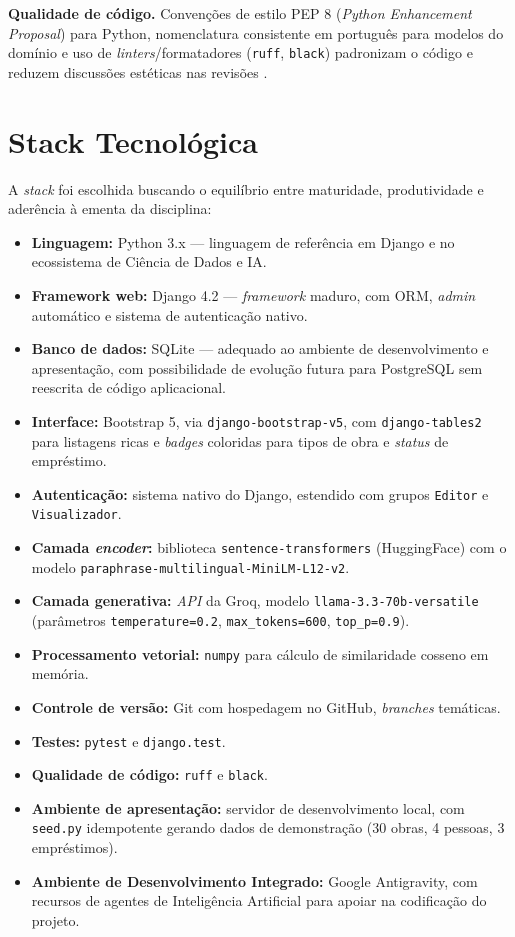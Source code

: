 \documentclass[monografia,abnt]{inf-ufg-modificado}
\begin{document}
\noindent\textbf{Qualidade de código.} Convenções de estilo PEP 8 (\textit{Python Enhancement Proposal}) para Python, nomenclatura consistente em português para modelos do domínio e uso de \textit{linters}/formatadores (\texttt{ruff}, \texttt{black}) padronizam o código e reduzem discussões estéticas nas revisões \cite{pep8}.

\chapter{Stack Tecnológica}

A \textit{stack} foi escolhida buscando o equilíbrio entre maturidade, produtividade e aderência à ementa da disciplina:

\begin{itemize}
    \item \textbf{Linguagem:} Python 3.x --- linguagem de referência em Django e no ecossistema de Ciência de Dados e IA.
    \item \textbf{Framework web:} Django 4.2 --- \textit{framework} maduro, com ORM, \textit{admin} automático e sistema de autenticação nativo.
    \item \textbf{Banco de dados:} SQLite --- adequado ao ambiente de desenvolvimento e apresentação, com possibilidade de evolução futura para PostgreSQL sem reescrita de código aplicacional.
    \item \textbf{Interface:} Bootstrap 5, via \texttt{django-bootstrap-v5}, com \texttt{django-tables2} para listagens ricas e \textit{badges} coloridas para tipos de obra e \textit{status} de empréstimo.
    \item \textbf{Autenticação:} sistema nativo do Django, estendido com grupos \texttt{Editor} e \texttt{Visualizador}.
    \item \textbf{Camada \textit{encoder}:} biblioteca \texttt{sentence-transformers} (HuggingFace) com o modelo \texttt{paraphrase-multilingual-MiniLM-L12-v2}.
    \item \textbf{Camada generativa:} \textit{API} da Groq, modelo \texttt{llama-3.3-70b-versatile} (parâmetros \texttt{temperature=0.2}, \texttt{max\_tokens=600}, \texttt{top\_p=0.9}).
    \item \textbf{Processamento vetorial:} \texttt{numpy} para cálculo de similaridade cosseno em memória.
    \item \textbf{Controle de versão:} Git com hospedagem no GitHub, \textit{branches} temáticas.
    \item \textbf{Testes:} \texttt{pytest} e \texttt{django.test}.
    \item \textbf{Qualidade de código:} \texttt{ruff} e \texttt{black}.
    \item \textbf{Ambiente de apresentação:} servidor de desenvolvimento local, com \texttt{seed.py} idempotente gerando dados de demonstração (30 obras, 4 pessoas, 3 empréstimos).
    \item \textbf{Ambiente de Desenvolvimento Integrado:} Google Antigravity, com recursos de agentes de Inteligência Artificial para apoiar na codificação do projeto.
\end{itemize}
\end{document}

